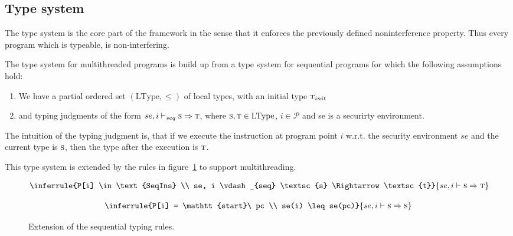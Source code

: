 \documentclass[a4paper,10pt]{llncs}
\begin{document}
\subsection{Type system}
\label{sec:typesystem}
The type system is the core part of the framework in the sense that it
enforces the previously defined noninterference property. Thus every
program which is typeable, is non-interfering.

The type system for multithreaded programs is build up from a type system
for sequential programs for which the following assumptions hold:

\begin{enumerate}
\item We have a partial ordered set $(\text{LType}, \leq)$ of local types, with an initial
      type $\textsc{t}_{init}$
\item and typing judgments of the form $se, i \vdash_{seq} \textsc{s} \Rightarrow \textsc{t}$, where
      $\textsc{s}, \textsc{t} \in \text{LType}$, $i \in \mathcal{P}$ and se is a securirty environment.
\end{enumerate}

The intuition of the typing judgment is, that if we execute the instruction at program
point $i$ w.r.t. the security environment $se$ and the current type is $\textsc{s}$, then the
type after the execution is $\textsc{t}$.

This type system is extended by the rules in figure~\ref{fig:multithreaded-typing-rules} to support multithreading.

\begin{figure}
\begin{minipage}{.5\textwidth}
\begin{align*}
\inferrule{P[i] \in \text{SeqIns} \\ se, i \vdash_{seq} \textsc{s} \Rightarrow \textsc{t}}
{se, i \vdash \textsc{s} \Rightarrow \textsc{t}}
\end{align*}
\end{minipage}
\begin{minipage}{.5\textwidth}
\begin{align*}
\inferrule{P[i] = \mathtt{start}\ pc \\ se(i) \leq se(pc)}
{se, i \vdash \textsc{s} \Rightarrow \textsc{s}}
\end{align*}
\end{minipage}
\caption{Extension of the sequential typing rules.}
\label{fig:multithreaded-typing-rules}
\end{figure}
\end{document}
